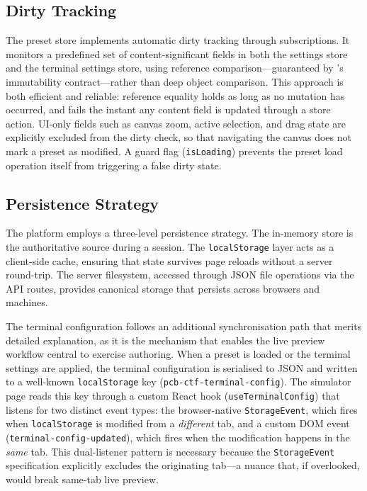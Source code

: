 \subsection{Dirty Tracking}\label{subsec:dirty}

The preset store implements automatic dirty tracking through \zustand{} subscriptions. It monitors a predefined set of content-significant fields in both the settings store and the terminal settings store, using reference comparison---guaranteed by \zustand{}'s immutability contract---rather than deep object comparison. This approach is both efficient and reliable: reference equality holds as long as no mutation has occurred, and fails the instant any content field is updated through a store action. UI-only fields such as canvas zoom, active selection, and drag state are explicitly excluded from the dirty check, so that navigating the canvas does not mark a preset as modified. A guard flag (\texttt{isLoading}) prevents the preset load operation itself from triggering a false dirty state.

\subsection{Persistence Strategy}\label{subsec:persistence}

The platform employs a three-level persistence strategy. The in-memory \zustand{} store is the authoritative source during a session. The \texttt{localStorage} layer acts as a client-side cache, ensuring that state survives page reloads without a server round-trip. The server filesystem, accessed through JSON file operations via the API routes, provides canonical storage that persists across browsers and machines.

The terminal configuration follows an additional synchronisation path that merits detailed explanation, as it is the mechanism that enables the live preview workflow central to exercise authoring. When a preset is loaded or the terminal settings are applied, the terminal configuration is serialised to JSON and written to a well-known \texttt{localStorage} key (\texttt{pcb-ctf-terminal-config}). The simulator page reads this key through a custom React hook (\texttt{useTerminalConfig}) that listens for two distinct event types: the browser-native \texttt{StorageEvent}, which fires when \texttt{localStorage} is modified from a \emph{different} tab, and a custom DOM event (\texttt{terminal-config-updated}), which fires when the modification happens in the \emph{same} tab. This dual-listener pattern is necessary because the \texttt{StorageEvent} specification explicitly excludes the originating tab---a nuance that, if overlooked, would break same-tab live preview.

